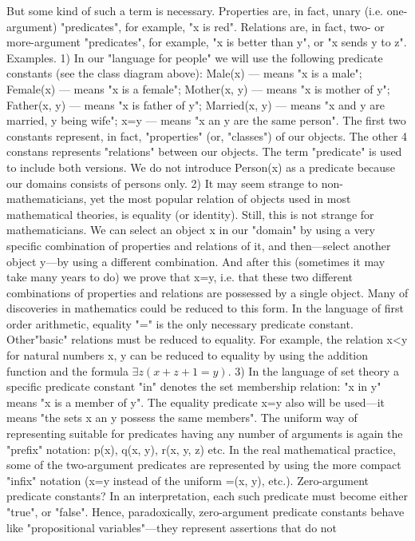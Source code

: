 But some kind of such a term is necessary. Properties are, in fact, unary (i.e. one-argument) "predicates",
for example, "x is red". Relations are, in fact, two- or more-argument "predicates", for example, "x is
better than y", or "x sends y to z".
Examples. 1) In our "language for people" we will use the following predicate constants (see the class diagram above):
Male(x) --- means "x is a male";
Female(x) --- means "x is a female";
Mother(x, y) --- means "x is mother of y";
Father(x, y) --- means "x is father of y";
Married(x, y) --- means "x and y are married, y being wife";
x=y --- means "x an y are the same person".
The first two constants represent, in fact, "properties" (or, "classes") of our objects. The other 4 constans represents "relations"
between our objects. The term "predicate" is used to include both versions. We do not introduce Person(x) as a predicate
because our domains consists of persons only.
2) It may seem strange to non-mathematicians, yet the most popular relation of objects used in most mathematical theories, is
equality (or identity). Still, this is not strange for mathematicians. We can select an object x in our "domain" by using a very
specific combination of properties and relations of it, and then---select another object y---by using a different combination.
And after this (sometimes it may take many years to do) we prove that x=y, i.e. that these two different combinations of
properties and relations are possessed by a single object. Many of discoveries in mathematics could be reduced to this form.
In the language of first order arithmetic, equality "=" is the only necessary predicate constant. Other"basic" relations must be
reduced to equality. For example, the relation x<y for natural numbers x, y can be reduced to equality by using the addition
function and the formula \(\exists z(x+z+1=y)\).
3) In the language of set theory a specific predicate constant "in" denotes the set membership relation: "x in y" means "x is a
member of y". The equality predicate x=y also will be used---it means "the sets x an y possess the same members".
The uniform way of representing suitable for predicates having any number of arguments is again the
"prefix" notation: p(x), q(x, y), r(x, y, z) etc. In the real mathematical practice, some of the two-argument
predicates are represented by using the more compact "infix" notation (x=y instead of the uniform =(x, y),
etc.).
Zero-argument predicate constants? In an interpretation, each such predicate must become either "true", or "false". Hence,
paradoxically, zero-argument predicate constants behave like "propositional variables"---they represent assertions that do not
